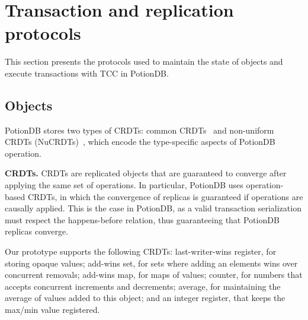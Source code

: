 \documentclass[sigplan,twocolumn,review,anonymous]{acmart}
\begin{document}



\section{Transaction and replication protocols}
\label{sec:transactions}

This section presents the 
protocols used to maintain the state of objects
and execute transactions with TCC in PotionDB. 

\subsection{Objects}
\label{sec:tx:objs}

PotionDB stores two types of CRDTs: common CRDTs~\cite{crdt} and non-uniform CRDTs (NuCRDTs)~\cite{Cabrita17Nonuniform}, 
which encode the type-specific aspects of PotionDB operation.

\noindent
\textbf{CRDTs.} CRDTs are replicated objects that are guaranteed to converge
after applying the same set of operations. In particular, PotionDB uses operation-based CRDTs,
in which the convergence of replicas is guaranteed if operations are causally applied.
This is the case in PotionDB, as a valid transaction serialization must respect the happens-before
relation, thus guaranteeing that PotionDB replicas converge.

Our prototype supports the following CRDTs: last-writer-wins register, for storing opaque values;
add-wins set, for sets where adding an elements wins over concurrent removals;
add-wins map, for maps of values;
counter, for numbers that accepts concurrent increments and decrements;
average, for maintaining the average of values added to this object;
and an integer register, that keeps the max/min value registered. %
\end{document}
